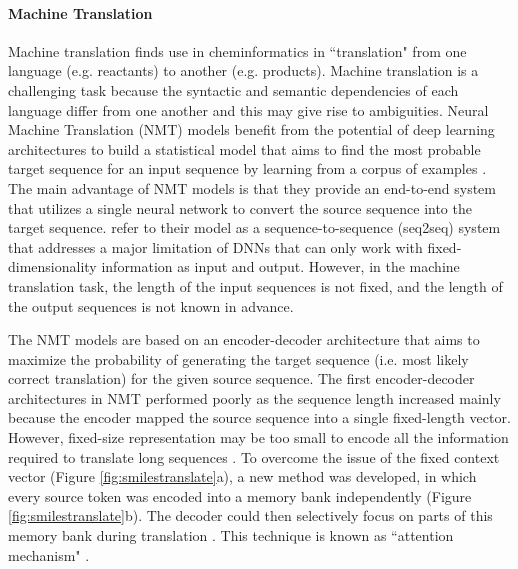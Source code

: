 \documentclass[review]{elsarticle}
\begin{document}
\paragraph{Machine Translation} Machine translation finds use in cheminformatics in ``translation" from one language (e.g. reactants) to another (e.g. products). Machine translation is a challenging task because the syntactic and semantic dependencies of each language differ from one another and this may give rise to ambiguities. Neural Machine Translation (NMT) models benefit from the potential of deep learning architectures to build a statistical model that aims to find the most probable target sequence for an input sequence by learning from a corpus of examples \cite{sutskever2014sequence, cho2014learning}. The main advantage of NMT models is that they provide an end-to-end system that utilizes a single neural network to convert the source sequence into the target sequence. \citet{sutskever2014sequence} refer to their model as a sequence-to-sequence (seq2seq) system that addresses a major limitation of DNNs that can only work with fixed-dimensionality information as input and output. However, in the machine translation task, the length of the input sequences is not fixed, and the length of the output sequences is not known in advance. 

The NMT models are based on an encoder-decoder architecture that aims to maximize the probability of generating the target sequence (i.e. most likely correct translation) for the given source sequence. The first encoder-decoder architectures in NMT performed poorly as the sequence length increased mainly because the encoder mapped the source sequence into a single fixed-length vector. However, fixed-size representation may be too small to encode all the information required to translate long sequences \cite{bahdanau2014neural}. To overcome the issue of the fixed context vector (Figure  \ref{fig:smilestranslate}a), a new method was developed, in which every source token was encoded into a memory bank independently (Figure \ref{fig:smilestranslate}b). The decoder could then selectively focus on parts of this memory bank during translation \cite{bahdanau2014neural, luong2015effective}. This technique is known as ``attention mechanism" \cite{graves2013generating}. 

\end{document}
